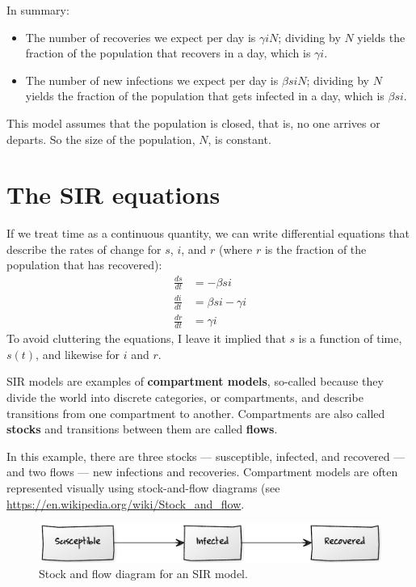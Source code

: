 \documentclass[12pt]{book}
\theoremstyle{exercise}
\begin{document}
In summary:

\begin{itemize}

\item The number of recoveries we expect per day is $\gamma i N$; dividing by $N$ yields the fraction of the population that recovers in a day, which is $\gamma i$.

\item The number of new infections we expect per day is $\beta s i N$; dividing by $N$ yields the fraction of the population that gets infected in a day, which is $\beta s i$.

\end{itemize}

This model assumes that the population is closed, that is, no one arrives or departs.  So the size of the population, $N$, is constant.


\section{The SIR equations}
\label{sireqn}

If we treat time as a continuous quantity, we can write differential equations that describe the rates of change for $s$, $i$, and $r$ (where $r$ is the fraction of the population that has recovered):
%
\begin{align*}
\frac{ds}{dt} &= -\beta s i \\
\frac{di}{dt} &= \beta s i - \gamma i\\
\frac{dr}{dt} &= \gamma i
\end{align*}
%
To avoid cluttering the equations, I leave it implied that $s$ is a function of time, $s(t)$, and likewise for $i$ and $r$.

SIR models are examples of {\bf compartment models}, so-called because they divide the world into discrete categories, or compartments, and describe transitions from one compartment to another.  Compartments are also called {\bf stocks} and transitions between them are called {\bf flows}.

In this example, there are three stocks --- susceptible, infected, and recovered --- and two flows --- new infections and recoveries.  Compartment models are often represented visually using stock-and-flow diagrams (see \url{https://en.wikipedia.org/wiki/Stock_and_flow}.

\begin{figure}
\centerline{\includegraphics[width=4.5in]{figs/stock_flow1.pdf}}
\caption{Stock and flow diagram for an SIR model.}
\label{stock_flow1}
\end{figure}
\end{document}
